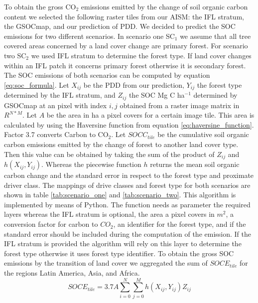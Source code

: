 		To obtain the gross CO$_2$ emissions emitted by the change of soil organic carbon content we selected the following raster tiles from our \ac{AISM}: the \ac{IFL} stratum, the \ac{GSOCmap}, and our prediction of \ac{PDD}. We decided to predict the \ac{SOC} emissions for two different scenarios. In scenario one SC$_1$ we assume that all tree covered areas concerned by a land cover change are primary forest. For scenario two SC$_2$ we used \ac{IFL} stratum to determine the forest type. If land cover changes within an \ac{IFL} patch it concerns primary forest otherwise it is secondary forest. The \ac{SOC} emissions of both scenarios can be computed by equation \ref{eq:soc_formula}. Let $X_{ij}$ be the \ac{PDD} from our prediction, $Y_{ij}$ the forest type determined by the \ac{IFL} stratum, and $Z_{ij}$ the \ac{SOC} Mg C ha$^{-1}$ determined by \ac{GSOCmap} at an pixel with index $i,j$ obtained from a raster image matrix in $R^{N*M}$. Let $A$ be the area in ha a pixel covers for a certain image tile. This area is calculated by using the Haversine function from equation \ref{eq:haversine_function}. Factor 3.7 converts Carbon to CO$_2$. Let $SOCC_{tile}$ be the cumulative soil organic carbon emissions emitted by the change of forest to another land cover type. Then this value can be obtained by taking the sum of the product of $Z_{ij}$ and $h(X_{ij}, Y_{ij})$. Whereas the piecewise function $h$ returns the mean soil organic carbon change and the standard error in respect to the forest type and proximate driver class. The mappings of drive classes and forest type for both scenarios are shown in table \ref{tab:scenario_one} and \ref{tab:scenario_two}. This algorithm is implemented by means of Python. The function needs as parameter the required layers whereas the \ac{IFL} stratum is optional, the area a pixel covers in $m^2$, a conversion factor for carbon to $CO_2$, an identifier for the forest type, and if the standard error should be included during the computation of the emission. If the \ac{IFL} stratum is provided the algorithm will rely on this layer to determine the forest type otherwise it uses forest type identifier. To obtain the gross \ac{SOC} emissions by the transition of land cover we aggregated the sum of $SOCE_{tile}$ for the regions Latin America, Asia, and Africa. 
		\begin{equation}
		\label{eq:soc_formula}
			SOCE_{tile} = 3.7A\displaystyle\sum_{i=0}^{N}\displaystyle\sum_{j=0}^{M} h(X_{ij}, Y_{ij})Z_{ij}
		\end{equation}
